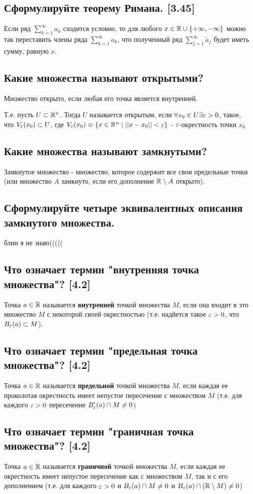 \documentclass[12pt, a4paper]{article}
\begin{document}
    \subsection{Сформулируйте теорему Римана. [3.45]}
    Если ряд $\sum_{k=1}^{\infty} a_k$ сходится условно, то для любого $x \in \mathbb{R} \cup \{+\infty, -\infty\}$ можно так переставить члены ряда $\sum_{k=1}^{\infty} a_k$, что полученный ряд $\sum_{j=1}^{\infty} \widetilde{a}_j$ будет иметь сумму, равную $x$.
    \subsection{Какие множества называют открытыми?}
    Множество открыто, если любая его точка является внутренней.

    Т.е. пусть $U \subset \mathbb{R}^n$. Тогда $U$ называется открытым, если $\forall x_0 \in U \exists \varepsilon > 0$, такое, что $V_{\varepsilon} (x_0) \subset U$, где $V_{\varepsilon} (x_0) \equiv \{x \in \mathbb{R}^n \mid  ||x - x_0 || < \varepsilon\}$ - $\varepsilon$-окрестность точки $x_0$
    \subsection{Какие множества называют замкнутыми?}
    Замкнутое множество - множество, которое содержит все свои предельные точки (или множество $A$ замкнуто, если его дополнение $\mathbb{R} \setminus A$ открыто).
    \subsection{Сформулируйте четыре эквивалентных описания замкнутого множества.}
    блин я не знаю(((((
    \subsection{Что означает термин "внутренняя точка множества"? [4.2]}
    Точка $a \in \mathbb{R}$ называется \textbf{внутренней} точкой множества $M$, если она входит в это множество $M$ с некоторой своей окрестностью (т.е. надйется такое $\varepsilon > 0$, что $B_{\varepsilon}(a) \subset M$).
    \subsection{Что означает термин "предельная точка множества"? [4.2]}
     Точка $a \in \mathbb{R}$ называется \textbf{предельной} точкой множества $M$, если каждая ее проколотая окрестность имеет непустое пересечение с множеством $M$ (т.е. для каждого $\varepsilon > 0$ пересечение $B_{\varepsilon}'(a) \cap M \ne 0$)
            \subsection{Что означает термин "граничная точка множества"? [4.2]}
Точка $a \in \mathbb{R}$ называется \textbf{граничной} точкой множества $M$, если каждая ее окрестность имеет непустое пересечение как с множеством $M$, так и с его дополнением (т.е. для каждого $\varepsilon > 0$ и $B_{\varepsilon}(a) \cap M \ne 0$ и $B_{\varepsilon}(a) \cap (\mathbb{R} \setminus M) \ne 0$)
\end{document}
